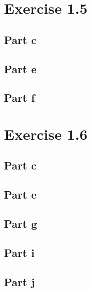 \documentclass{article}
\begin{document}
\section{Exercise 1.5}

\subsection{Part c}

\subsection{Part e}

\subsection{Part f}

\section{Exercise 1.6}

\subsection{Part c}

\subsection{Part e}

\subsection{Part g}

\subsection{Part i}

\subsection{Part j}

\section{}

\section{}
\end{document}
